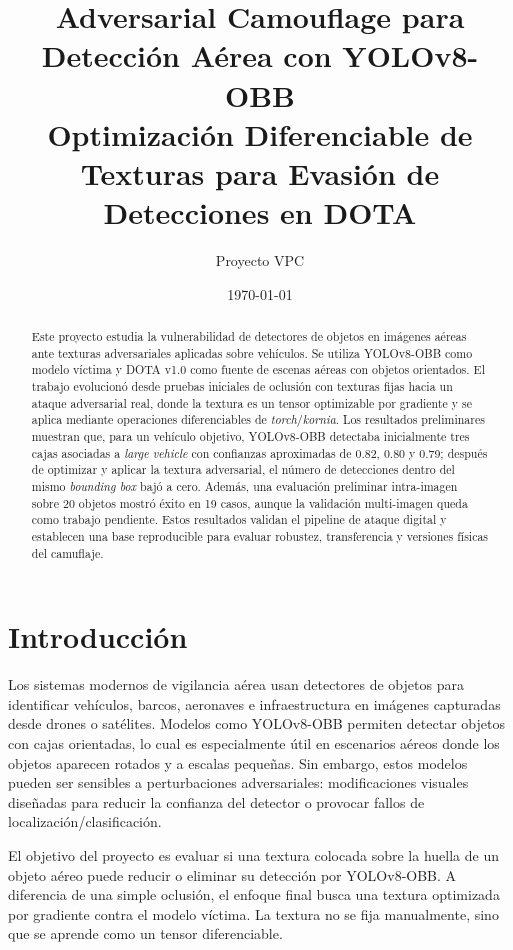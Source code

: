 \documentclass[12pt,a4paper]{article}
\title{\textbf{Adversarial Camouflage para Detección Aérea con YOLOv8-OBB}\\
\large Optimización Diferenciable de Texturas para Evasión de Detecciones en DOTA}
\author{Proyecto VPC}
\date{\today}
\begin{document}
\maketitle

\begin{abstract}
Este proyecto estudia la vulnerabilidad de detectores de objetos en imágenes aéreas ante texturas adversariales aplicadas sobre vehículos. Se utiliza YOLOv8-OBB como modelo víctima y DOTA v1.0 como fuente de escenas aéreas con objetos orientados. El trabajo evolucionó desde pruebas iniciales de oclusión con texturas fijas hacia un ataque adversarial real, donde la textura es un tensor optimizable por gradiente y se aplica mediante operaciones diferenciables de \textit{torch}/\textit{kornia}. Los resultados preliminares muestran que, para un vehículo objetivo, YOLOv8-OBB detectaba inicialmente tres cajas asociadas a \textit{large vehicle} con confianzas aproximadas de 0.82, 0.80 y 0.79; después de optimizar y aplicar la textura adversarial, el número de detecciones dentro del mismo \textit{bounding box} bajó a cero. Además, una evaluación preliminar intra-imagen sobre 20 objetos mostró éxito en 19 casos, aunque la validación multi-imagen queda como trabajo pendiente. Estos resultados validan el pipeline de ataque digital y establecen una base reproducible para evaluar robustez, transferencia y versiones físicas del camuflaje.
\end{abstract}

\tableofcontents
\newpage

\section{Introducción}

Los sistemas modernos de vigilancia aérea usan detectores de objetos para identificar vehículos, barcos, aeronaves e infraestructura en imágenes capturadas desde drones o satélites. Modelos como YOLOv8-OBB permiten detectar objetos con cajas orientadas, lo cual es especialmente útil en escenarios aéreos donde los objetos aparecen rotados y a escalas pequeñas. Sin embargo, estos modelos pueden ser sensibles a perturbaciones adversariales: modificaciones visuales diseñadas para reducir la confianza del detector o provocar fallos de localización/clasificación.

El objetivo del proyecto es evaluar si una textura colocada sobre la huella de un objeto aéreo puede reducir o eliminar su detección por YOLOv8-OBB. A diferencia de una simple oclusión, el enfoque final busca una textura optimizada por gradiente contra el modelo víctima. La textura no se fija manualmente, sino que se aprende como un tensor diferenciable.
\end{document}
